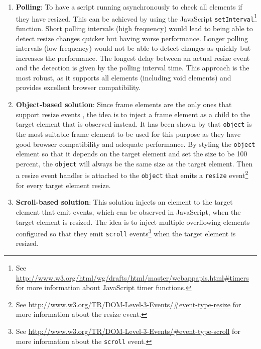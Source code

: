 \documentclass[a4paper,11pt]{kth-mag}
\newcommand{\code}[1]{\texttt{#1}}
\begin{document}
        \begin{enumerate}
          \item\label{itm:erd-approach-polling}
            \textbf{Polling}:
            To have a script running asynchronously to check all \glspl{element} if they have resized.
            This can be achieved by using the \gls{JavaScript} \code{setInterval}\footnote{See \url{http://www.w3.org/html/wg/drafts/html/master/webappapis.html\#timers} for more information about \gls{JavaScript} timer functions.} function.
            Short polling intervals (high frequency) would lead to being able to detect resize changes quicker but having worse performance.
            Longer polling intervals (low frequency) would not be able to detect changes as quickly but increases the performance.
            The longest delay between an actual resize event and the detection is given by the polling interval time.
            This approach is the most robust, as it supports all \glspl{element} (including void \glspl{element}) and provides excellent \gls{browser} compatibility.
          \item\label{itm:erd-approach-object}
            \textbf{Object-based solution}:
            Since frame \glspl{element} are the only ones that support resize events , the idea is to inject a frame \gls{element} as a child to the target \gls{element} that is observed instead.
            It has been shown by \cite{backalley} that \code{object} is the most suitable frame \gls{element} to be used for this purpose as they have good \gls{browser} compatibility and adequate performance.
            By styling the \code{object} element so that it depends on the target \gls{element} and set the size to be 100 percent, the \code{object} will always be the same size as the target \gls{element}.
            Then a resize event handler is attached to the \code{object} that emits a \code{resize} event\footnote{See \url{http://www.w3.org/TR/DOM-Level-3-Events/\#event-type-resize} for more information about the resize event.} for every target \gls{element} resize.
          \item\label{itm:erd-approach-scroll}
            \textbf{Scroll-based solution}:
            This solution injects an \gls{element} to the target element that emit events, which can be observed in \gls{JavaScript}, when the target element is resized.
            The idea is to inject multiple overflowing \glspl{element} configured so that they emit \code{scroll} events\footnote{See \url{http://www.w3.org/TR/DOM-Level-3-Events/\#event-type-scroll} for more information about the \code{scroll} event.} when the target element is resized.

\end{enumerate}
\end{document}
